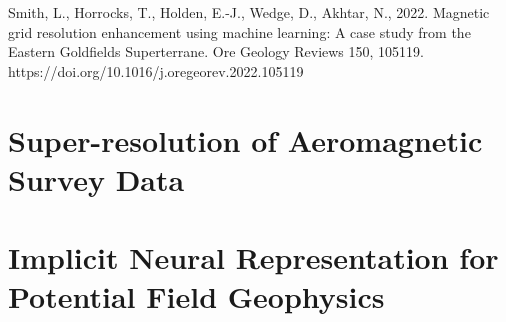 \documentclass[12pt,a4paper]{report} %
\begin{document}
Smith, L., Horrocks, T., Holden, E.-J., Wedge, D., Akhtar, N., 2022. Magnetic grid resolution enhancement using machine learning: A case study from the Eastern Goldfields Superterrane. Ore Geology Reviews 150, 105119.
https://doi.org/10.1016/j.oregeorev.2022.105119
% 
% 


\chapter{Super-resolution of Aeromagnetic Survey Data}
\label{paper2}
% 
% 


\chapter{Implicit Neural Representation for Potential Field Geophysics}
\label{paper3}
% 
% 


% 
% 

\end{document}

